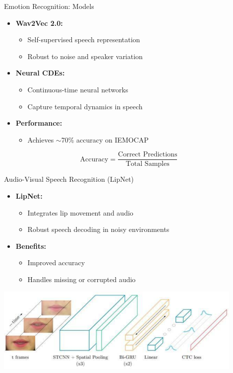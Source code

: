 \begin{frame}{Emotion Recognition: Models}
    \begin{itemize}
        \item \textbf{Wav2Vec 2.0:}
            \begin{itemize}
                \item Self-supervised speech representation
                \item Robust to noise and speaker variation
            \end{itemize}
        \item \textbf{Neural CDEs:}
            \begin{itemize}
                \item Continuous-time neural networks
                \item Capture temporal dynamics in speech
            \end{itemize}
        \item \textbf{Performance:}
            \begin{itemize}
                \item Achieves $\sim$70\% accuracy on IEMOCAP
            \end{itemize}
    \end{itemize}
    \begin{equation*}
        \text{Accuracy} = \frac{\text{Correct Predictions}}{\text{Total Samples}}
    \end{equation*}
\end{frame}

\begin{frame}{Audio-Visual Speech Recognition (LipNet)}
    \begin{itemize}
        \item \textbf{LipNet:}
            \begin{itemize}
                \item Integrates lip movement and audio
                \item Robust speech decoding in noisy environments
            \end{itemize}
        \item \textbf{Benefits:}
            \begin{itemize}
                \item Improved accuracy
                \item Handles missing or corrupted audio
            \end{itemize}
    \end{itemize}
    \begin{center}
        \includegraphics[width=0.9\textwidth]{images/audio-nlp/lipnet_architecture.png}
    \end{center}
\end{frame}